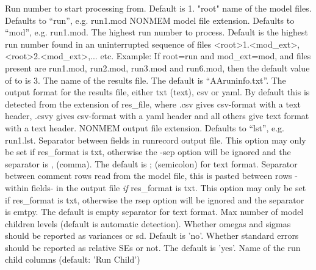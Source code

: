 \begin{optionlist}
Run number to start processing from. Default is 1. 
\nextopt
{}
"root" name of the model files. Defaults to “run”, e.g. run1.mod 
\nextopt
{}
NONMEM model file extension. Defaults to “mod”, e.g. run1.mod. 
\nextopt
{}
The highest run number to process. Default is the highest run number found in an uninterrupted sequence of files
<root>1.<mod\_ext>, <root>2.<mod\_ext>,... etc.
Example: If root=run and mod\_ext=mod, and files present are run1.mod, run2.mod, run3.mod and run6.mod,
then the default value of to is 3.
\nextopt
{}
The name of the results file. The default is “AAruninfo.txt”. 
\nextopt
{}
The output format for the results file, either txt (text), csv or yaml.  
By default this is detected from the extension of res\_file, 
where .csv gives csv-format with a text header, .csvy gives csv-format with 
a yaml header and all others give text format with a text header.
NONMEM output file extension. Defaults to “lst”, e.g. run1.lst. 
\nextopt
{}
Separator between fields in runrecord output file. This option may
only be set if res\_format is txt, otherwise the -sep option will be ignored 
and the separator is , (comma). The default is ; (semicolon) for text format.
\nextopt
{}
Separator between comment rows read from the model file, this is pasted 
between rows -within fields- in the output file \emph{if} res\_format is txt.
This option may only be set if res\_format is txt, otherwise the rsep option 
will be ignored and the separator is emtpy. The default is empty separator for text format.
\nextopt
{}
Max number of model children levels (default is automatic detection). 
\nextopt
{}
Whether omegas and sigmas should be reported as variances or sd. Default is 'no'. 
\nextopt
{}
Whether standard errors should be reported as relative SEs or not. The default is 'yes'. 
\nextopt
{}
Name of the run child columns (default: 'Run Child')
\nextopt
\end{optionlist}

